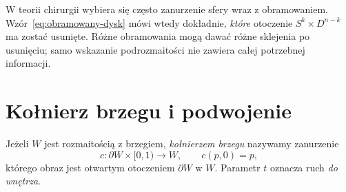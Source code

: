 W teorii chirurgii wybiera się
często zanurzenie sfery wraz z
obramowaniem. Wzór~\eqref{eq:obramowany-dysk}
mówi wtedy dokładnie, \emph{które}
otoczenie $S^k\times D^{n-k}$
ma zostać usunięte. Różne obramowania
mogą dawać różne sklejenia po usunięciu;
samo wskazanie podrozmaitości
nie zawiera całej potrzebnej informacji.

\section{Kołnierz brzegu i podwojenie}
\label{sec:kolnierz-15}

\begin{definicja}[Kołnierz]
Jeżeli $W$ jest rozmaitością z brzegiem,
\emph{kołnierzem brzegu} nazywamy zanurzenie
\[
 c:\partial W\times[0,1)\longrightarrow W,
 \qquad c(p,0)=p,
\]
którego obraz jest otwartym otoczeniem
$\partial W$ w $W$. Parametr $t$
oznacza ruch \emph{do wnętrza}.
\end{definicja}

